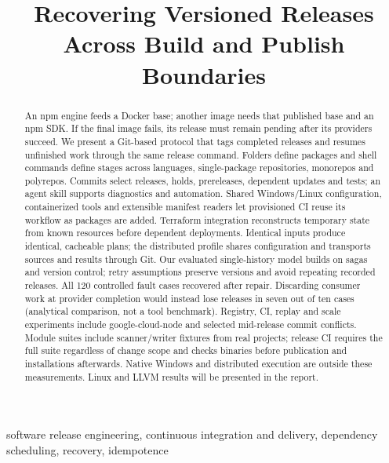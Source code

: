 \documentclass[10pt,conference]{IEEEtran}
\theoremstyle{definition}
\begin{document}
\title{Recovering Versioned Releases Across Build and Publish Boundaries}
\maketitle
\begin{abstract}
An npm engine feeds a Docker base; another image needs that published base
and an npm SDK. If the final image fails, its release must
remain pending after its providers succeed. We present a Git-based protocol
that tags completed releases and resumes unfinished work through the same
release command. Folders define packages and shell commands define stages
across languages, single-package repositories, monorepos and polyrepos.
Commits select releases, holds, prereleases, dependent updates and tests;
an agent skill supports diagnostics and automation. Shared Windows/Linux
configuration, containerized tools and extensible manifest readers let
provisioned CI reuse its workflow as packages are added. Terraform integration
reconstructs temporary state from known resources before dependent deployments.
Identical inputs produce identical, cacheable plans; the distributed profile
shares configuration and transports sources and results through Git.
Our evaluated single-history model builds on sagas and version control;
retry assumptions preserve versions and avoid repeating recorded releases.
All 120 controlled fault cases recovered after repair. Discarding consumer
work at provider completion would instead lose releases
in seven out of ten cases (analytical comparison, not a tool benchmark).
Registry, CI, replay and scale experiments include
google-cloud-node and selected mid-release commit conflicts.
Module suites include scanner/writer fixtures from real projects; release CI
requires the full suite regardless of change scope and checks binaries before
publication and installations afterwards. Native Windows and distributed
execution are outside these
measurements. Linux and LLVM results will be presented in the report.
\end{abstract}
\begin{IEEEkeywords}
software release engineering, continuous integration and delivery,
dependency scheduling, recovery, idempotence
\end{IEEEkeywords}






\clearpage
{}

\end{document}
